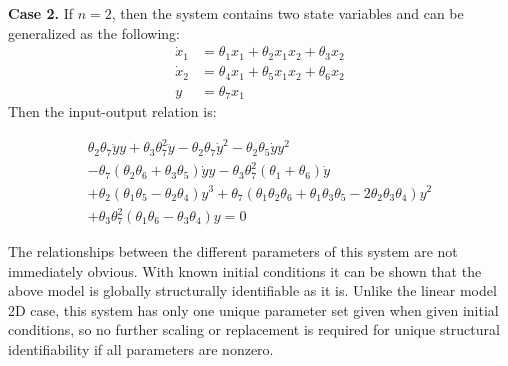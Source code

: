 \documentclass[a4paper,fleqn]{cas-dc}
\theoremstyle{definition}
\begin{document}
\vspace{0.2cm}
\noindent \textbf{Case 2.}
If $n=2$, then the system contains two state variables and can be generalized as the following:
\begin{align} \label{bilin2d_appendix}
    \dot{x}_1 &= \theta_1 x_1 + \theta_2 x_1 x_2 + \theta_3 x_2 \\ \nonumber
    \dot{x}_2 &= \theta_4 x_1 + \theta_5 x_1 x_2 + \theta_6 x_2 \\ \nonumber
    y &= \theta_7 x_1
\end{align}
Then the input-output relation is:
\begin{fleqn}
\begin{multline} \label{eq:bilin_io_2d_appendix_full}
    \theta_2  \theta_7 \ddot{y} y + \theta_3  \theta_7^2 \ddot{y}  
    -\theta_2  \theta_7 \dot{y}^2 
    - \theta_2  \theta_5 \dot{y} y^2 \\
    - \theta_7 ( \theta_2  \theta_6 +  \theta_3  \theta_5) \dot{y} y 
    - \theta_3  \theta_7^2 ( \theta_1 +  \theta_6) \dot{y} \\
    + \theta_2 ( \theta_1  \theta_5 -  \theta_2  \theta_4) y^3 
    + \theta_7 ( \theta_1  \theta_2  \theta_6 +  \theta_1  \theta_3  \theta_5 - 2  \theta_2  \theta_3  \theta_4) y^2  \\+ 
    \theta_3  \theta_7^2 ( \theta_1  \theta_6 -  \theta_3  \theta_4) y  = 0
\end{multline}
\end{fleqn}



The relationships between the different parameters of this system are not immediately obvious.
With known initial conditions it can be shown that the above model is globally structurally identifiable as it is. 
Unlike the linear model 2D case, this system has only one unique parameter set given when given initial conditions, so no further scaling or replacement is required for unique structural identifiability if all parameters are nonzero.
\end{document}
